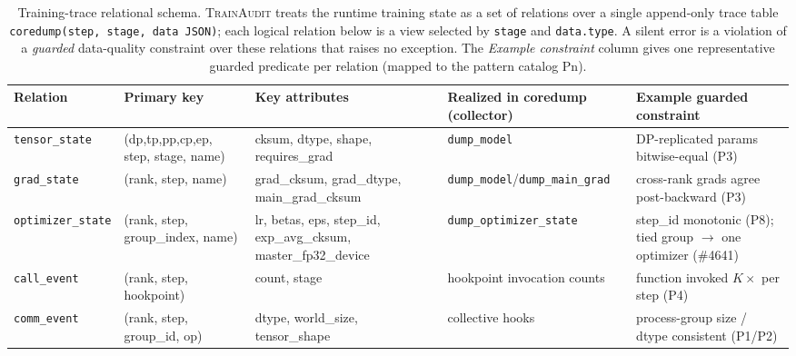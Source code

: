 
\begin{table}[t]
\centering
\small
\caption{Training-trace relational schema. \textsc{TrainAudit} treats the runtime training state as a set of relations over a single append-only trace table \texttt{coredump(step, stage, data\,JSON)}; each logical relation below is a view selected by \texttt{stage} and \texttt{data.type}. A silent error is a violation of a \emph{guarded} data-quality constraint over these relations that raises no exception. The \emph{Example constraint} column gives one representative guarded predicate per relation (mapped to the pattern catalog Pn).}
\label{tab:trace-relations}
\begin{tabular}{@{}lllll@{}}
\toprule
\textbf{Relation} & \textbf{Primary key} & \textbf{Key attributes} & \textbf{Realized in coredump (collector)} & \textbf{Example guarded constraint} \\
\midrule
\texttt{tensor\_state}    & (dp,tp,pp,cp,ep, step, stage, name) & cksum, dtype, shape, requires\_grad & \texttt{dump\_model} & DP-replicated params bitwise-equal (P3) \\
\texttt{grad\_state}      & (rank, step, name)                  & grad\_cksum, grad\_dtype, main\_grad\_cksum & \texttt{dump\_model}/\texttt{dump\_main\_grad} & cross-rank grads agree post-backward (P3) \\
\texttt{optimizer\_state} & (rank, step, group\_index, name)    & lr, betas, eps, step\_id, exp\_avg\_cksum, master\_fp32\_device & \texttt{dump\_optimizer\_state} & step\_id monotonic (P8); tied group $\to$ one optimizer (\#4641) \\
\texttt{call\_event}      & (rank, step, hookpoint)             & count, stage & hookpoint invocation counts & function invoked $K\times$ per step (P4) \\
\texttt{comm\_event}      & (rank, step, group\_id, op)         & dtype, world\_size, tensor\_shape & collective hooks & process-group size / dtype consistent (P1/P2) \\

\end{tabular}
\end{table}
